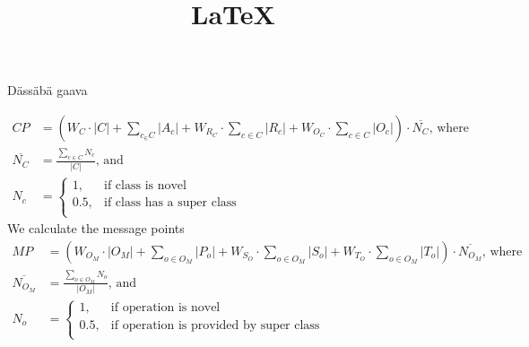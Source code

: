 \documentclass[12pt]{article}
\title{\LaTeX}
\date{}
\begin{document}
  \maketitle 
  Dässäbä gaava
 
  \begin{align}
  CP &= \left(W_C \cdot |C| + \sum_{c_ \in C} |A_c| + W_{R_C} \cdot \sum_{c \in C} |R_c| + W_{O_C} \cdot \sum_{c \in C} |O_c| \right) \cdot \overline{N_C},\, \text{where}\\
  \overline{N_C} &= \frac{\sum_{c \in C} N_c}{|C|},\, \text{and}\\
  N_c &=
 \begin{cases}
 1,& \text{if class is novel}\\
 0.5,& \text{if class has a super class}\\
 \end{cases}
 \end{align}
 We calculate the message points
 \begin{align}
 MP &= \left(W_{O_M} \cdot |O_M| + \sum_{o \in O_M} |P_o| + W_{S_O} \cdot \sum_{o \in O_M} |S_o| + W_{T_O} \cdot \sum_{o \in O_M} |T_o| \right) \cdot \overline{N_{O_M}},\,\text{where}\\
 \overline{N_{O_M}} &= \frac{\sum_{o \in O_M} N_o}{|O_M|},\,\text{and}\\
 N_o &= 
 \begin{cases}
 1,& \text{if operation is novel}\\
 0.5,& \text{if operation is provided by super class}\\
 \end{cases}
 \end{align}
 
 
 
\end{document}

